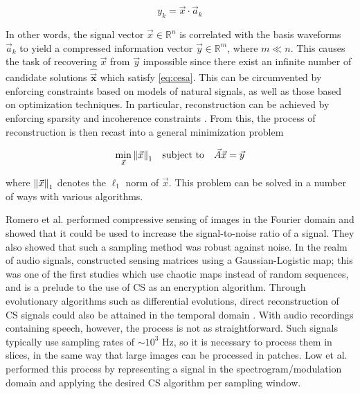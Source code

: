 \documentclass[10pt,a4paper,twoside]{article}
\begin{document}
\begin{equation}\label{eq:cesa}
	y_k = \vec{x} \cdot \vec{a}_k
\end{equation}

In other words, the signal vector $\vec{x} \in \mathbb{R}^n$ is correlated with the basis waveforms $\vec{a}_k$ to yield a compressed information vector $\vec{y} \in \mathbb{R}^m$, where $m \ll n$. This causes the task of recovering $\vec{x}$ from $\vec{y}$ impossible since there exist an infinite number of candidate solutions $\bm\hat{\vec{x}}$ which satisfy \eqref{eq:cesa}. This can be circumvented by enforcing constraints based on models of natural signals, as well as those based on optimization techniques. In particular, reconstruction can be achieved by enforcing sparsity and incoherence constraints \cite{Candes2008b}. From this, the process of reconstruction is then recast into a general minimization problem

\begin{equation}\label{eq:minl1}
	\min_{\vec{x}} \norm{\vec{x}}_1 \quad \textrm{subject to} \quad \vec{A}\vec{x} = \vec{y}
\end{equation}

\noindent where $\norm{\vec{x}}_1$ denotes the $\ell_1$ norm of $\vec{x}$. This problem can be solved in a number of ways with various algorithms.

Romero et al. \cite{Romero2016,Romero2018} performed compressive sensing of images in the Fourier domain and showed that it could be used to increase the signal-to-noise ratio of a signal. They also showed that such a sampling method was robust against noise. In the realm of audio signals, \cite{Mathew2016} constructed sensing matrices using a Gaussian-Logistic map; this was one of the first studies which use chaotic maps instead of random sequences, and is a prelude to the use of CS as an encryption algorithm. Through evolutionary algorithms such as differential evolutions, direct reconstruction of CS signals could also be attained in the temporal domain \cite{Andras2018}. With audio recordings containing speech, however, the process is not as straightforward. Such signals typically use sampling rates of $\sim 10^{3}$ Hz, so it is necessary to process them in slices, in the same way that large images can be processed in patches. Low et al. \cite{Low2013,Low2018} performed this process by representing a signal in the spectrogram/modulation domain and applying the desired CS algorithm per sampling window.
\end{document}
